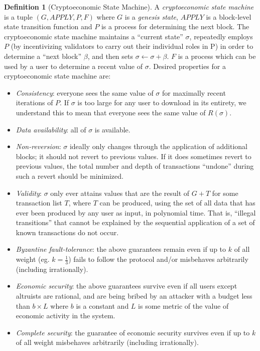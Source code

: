 \documentclass[11pt,a4paper]{report}
\theoremstyle{plain}
\theoremstyle{definition}
\newtheorem{defn}{Definition}[chapter]
\theoremstyle{remark}
\begin{document}
\begin{defn}[Cryptoeconomic State Machine]
A \emph{cryptoeconomic state machine} is a tuple $(G, APPLY, P, F)$ where $G$ is a \emph{genesis state}, $APPLY$ is a block-level state transition function and $P$ is a process for determining the next block. The cryptoeconomic state machine maintains a ``current state'' $\sigma$, repeatedly employs $P$ (by incentivizing validators to carry out their individual roles in P) in order to determine a ``next block'' $\beta$, and then sets $\sigma \leftarrow \sigma + \beta$. $F$ is a process which can be used by a user to determine a recent value of $\sigma$. Desired properties for a cryptoeconomic state machine are:

\begin{itemize}
\item
\emph{Consistency}: everyone sees the same value of $\sigma$ for maximally recent iterations of $P$. If $\sigma$ is too large for any user to download in its entirety, we understand this to mean that everyone sees the same value of $R(\sigma)$.
\item
\emph{Data availability}: all of $\sigma$ is available.
\item
\emph{Non-reversion}: $\sigma$ ideally only changes through the application of additional blocks; it should not revert to previous values. If it does sometimes revert to previous values, the total number and depth of transactions ``undone'' during such a revert should be minimized.
\item
\emph{Validity}: $\sigma$ only ever attains values that are the result of $G + T$ for some transaction list $T$, where $T$ can be produced, using the set of all data that has ever been produced by any user as input, in polynomial time. That is, ``illegal transitions'' that cannot be explained by the sequential application of a set of known transactions do not occur.
\item
\emph{Byzantine fault-tolerance}: the above guarantees remain even if up to $k$ of all weight (eg. $k = \frac{1}{3}$) fails to follow the protocol and/or misbehaves arbitrarily (including irrationally).
\item
\emph{Economic security}: the above guarantees survive even if all users except altruists are rational, and are being bribed by an attacker with a budget less than $b \times  L$ where $b$ is a constant and $L$ is some metric of the value of economic activity in the system.
\item
\emph{Complete security}: the guarantee of economic security survives even if up to $k$ of all weight misbehaves arbitrarily (including irrationally).
\end{itemize}
\end{defn}
\end{document}
